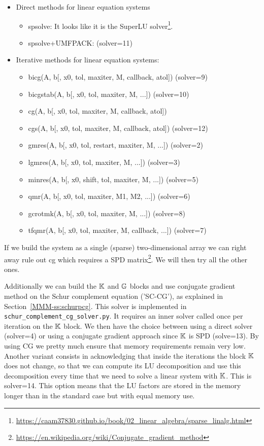 \begin{itemize}
\item Direct methods for linear equation systems
\begin{itemize}
\item {\python spsolve}:  
It looks like it is the SuperLU solver\footnote{\url{https://caam37830.github.io/book/02_linear_algebra/sparse_linalg.html}}. 
\item {\python spsolve+UMFPACK}: ({\python solver=11}) 
\end{itemize}
\item Iterative methods for linear equation systems:
\begin{itemize}
\item {\python bicg}(A, b[, x0, tol, maxiter, M, callback, atol]) ({\python solver=9})
\item {\python bicgstab}(A, b[, x0, tol, maxiter, M, ...]) ({\python solver=10})
\item {\python cg}(A, b[, x0, tol, maxiter, M, callback, atol])
\item {\python cgs}(A, b[, x0, tol, maxiter, M, callback, atol])  ({\python solver=12})
\item {\python gmres}(A, b[, x0, tol, restart, maxiter, M, ...]) ({\python solver=2})
\item {\python lgmres}(A, b[, x0, tol, maxiter, M, ...]) ({\python solver=3})
\item {\python minres}(A, b[, x0, shift, tol, maxiter, M, ...]) ({\python solver=5})
\item {\python qmr}(A, b[, x0, tol, maxiter, M1, M2, ...]) ({\python solver=6})
\item {\python gcrotmk}(A, b[, x0, tol, maxiter, M, ...]) ({\python solver=8})
\item {\python tfqmr}(A, b[, x0, tol, maxiter, M, callback, ...]) ({\python solver=7})
\end{itemize}
\end{itemize}

If we build the system as a single (sparse) two-dimensional array 
we can right away rule out {\python cg} which requires 
a SPD matrix\footnote{\url{https://en.wikipedia.org/wiki/Conjugate_gradient_method}}. 
We will then try all the other ones.

Additionally we can build the ${\mathbb{K}}$ and ${\mathbb{G}}$ blocks and use conjugate gradient method on 
the Schur complement equation ('SC-CG'), as explained in Section~\ref{MMM-ss:schurpcg}.
This solver is implemented in {\tt schur\_complement\_cg\_solver.py}.
It requires an inner solver called once per iteration on the ${\mathbb{K}}$ block.
We then have the choice between using a direct solver ({\python solver=4})
or using a conjugate gradient
approach since ${\mathbb{K}}$ is SPD ({\python solve=13}). 
By using CG we pretty much ensure that memory 
requirements remain very low.
Another variant consists in acknowledging that inside the iterations the 
block ${\mathbb{K}}$ does not change, so that we can compute its LU decomposition
and use this decomposition every time that we need to solve a linear
system with ${\mathbb{K}}$. This is {\python solver=14}. 
This option means that the LU factors are stored in the memory longer than in the standard
case but with equal memory use.

